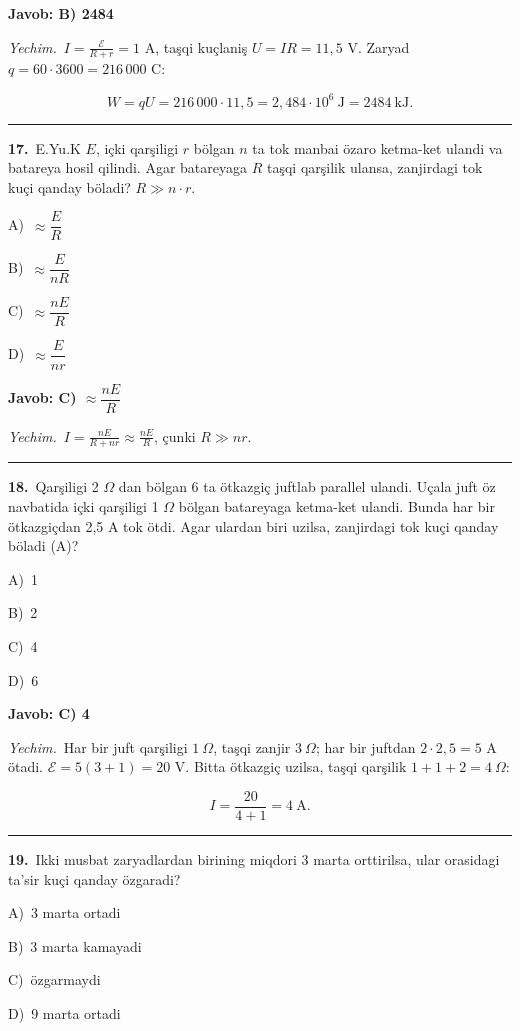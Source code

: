 \documentclass[11pt,a4paper]{article}
\newcommand{\opt}[2]{\hspace*{4mm}#1)\ #2\par}
\begin{document}
\noindent\colorbox{gray!12}{\parbox{\dimexpr\linewidth-2\fboxsep}{\textbf{Javob: B) 2484}}}\par\smallskip
\noindent\textit{Yechim.}\ $I=\frac{\mathcal E}{R+r}=1$ A, taşqi kuçlaniş $U=IR=11{,}5$ V. Zaryad $q=60\cdot3600=216\,000$ C:\par
\[W=qU=216\,000\cdot11{,}5=2{,}484\cdot10^6\ \text{J}=2484\ \text{kJ}.\]\par\medskip\hrule\medskip
{}\noindent\begin{minipage}{\linewidth}
\textbf{17.}\ E.Yu.K $E$, içki qarşiligi $r$ bölgan $n$ ta tok manbai özaro ketma-ket ulandi va batareya hosil qilindi. Agar batareyaga $R$ taşqi qarşilik ulansa, zanjirdagi tok kuçi qanday böladi? $R\gg n\cdot r$.\par\smallskip
\opt{A}{$\approx\dfrac{E}{R}$}
\opt{B}{$\approx\dfrac{E}{nR}$}
\opt{C}{$\approx\dfrac{nE}{R}$}
\opt{D}{$\approx\dfrac{E}{nr}$}
\end{minipage}\vspace{2pt}\par
\noindent\colorbox{gray!12}{\parbox{\dimexpr\linewidth-2\fboxsep}{\textbf{Javob: C) $\approx\dfrac{nE}{R}$}}}\par\smallskip
\noindent\textit{Yechim.}\ $I=\frac{nE}{R+nr}\approx\frac{nE}{R}$, çunki $R\gg nr$.\par\par\medskip\hrule\medskip
{}\noindent\begin{minipage}{\linewidth}
\textbf{18.}\ Qarşiligi 2 $\Omega$ dan bölgan 6 ta ötkazgiç juftlab parallel ulandi. Uçala juft öz navbatida içki qarşiligi 1 $\Omega$ bölgan batareyaga ketma-ket ulandi. Bunda har bir ötkazgiçdan 2,5 A tok ötdi. Agar ulardan biri uzilsa, zanjirdagi tok kuçi qanday böladi (A)?\par\smallskip
\opt{A}{1}
\opt{B}{2}
\opt{C}{4}
\opt{D}{6}
\end{minipage}\vspace{2pt}\par
\noindent\colorbox{gray!12}{\parbox{\dimexpr\linewidth-2\fboxsep}{\textbf{Javob: C) 4}}}\par\smallskip
\noindent\textit{Yechim.}\ Har bir juft qarşiligi $1\ \Omega$, taşqi zanjir $3\ \Omega$; har bir juftdan $2\cdot2{,}5=5$ A ötadi. $\mathcal E=5(3+1)=20$ V. Bitta ötkazgiç uzilsa, taşqi qarşilik $1+1+2=4\ \Omega$:\par
\[I=\frac{20}{4+1}=4\ \text{A}.\]\par\medskip\hrule\medskip
{}\noindent\begin{minipage}{\linewidth}
\textbf{19.}\ Ikki musbat zaryadlardan birining miqdori 3 marta orttirilsa, ular orasidagi ta’sir kuçi qanday özgaradi?\par\smallskip
\opt{A}{3 marta ortadi}
\opt{B}{3 marta kamayadi}
\opt{C}{özgarmaydi}
\opt{D}{9 marta ortadi}
\end{minipage}\vspace{2pt}\par
\end{document}
